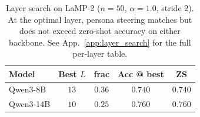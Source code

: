 \begin{table}[t]
\centering\small
\caption{Layer search on LaMP-2 ($n{=}50$, $\alpha{=}1.0$, stride $2$).
At the optimal layer, persona steering matches but does not exceed
zero-shot accuracy on either backbone. See
App.~\ref{app:layer_search} for the full per-layer table.}
\label{tab:layer_search}
\begin{tabular}{lcccc}
\toprule
Model      & Best $L$ & frac & Acc @ best & ZS \\
\midrule
Qwen3-8B   & $13$     & $0.36$ & $0.740$ & $0.740$ \\
Qwen3-14B  & $10$     & $0.25$ & $0.760$ & $0.760$ \\
\bottomrule
\end{tabular}
\end{table}
